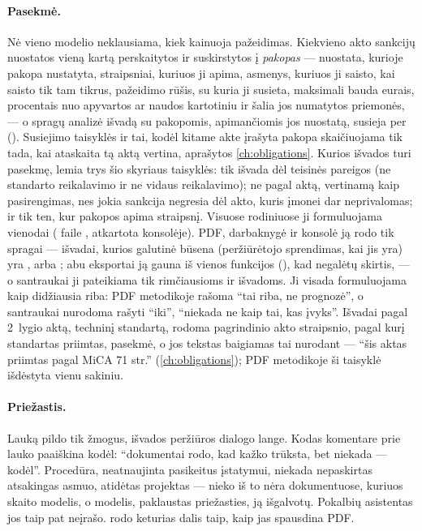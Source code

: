 \paragraph{Pasekmė.} Nė vieno modelio neklausiama, kiek kainuoja pažeidimas. Kiekvieno akto
sankcijų nuostatos vieną kartą perskaitytos ir suskirstytos į \emph{pakopas} --- nuostata, kurioje pakopa
nustatyta, straipsniai, kuriuos ji apima, asmenys, kuriuos ji saisto, kai saisto tik tam tikrus, pažeidimo rūšis, su kuria ji susieta, maksimali bauda
eurais, procentais nuo apyvartos ar naudos kartotiniu ir šalia jos numatytos priemonės, --- o
spragų analizė išvadą su pakopomis, apimančiomis jos nuostatą, susieja per
 (). Susiejimo taisyklės ir tai, kodėl kitame
akte įrašyta pakopa skaičiuojama tik tada, kai ataskaita tą aktą vertina, aprašytos
\cref{ch:obligations}. Kurios išvados turi pasekmę, lemia trys šio skyriaus taisyklės: tik
išvada dėl teisinės pareigos (ne standarto reikalavimo ir ne vidaus reikalavimo); ne pagal aktą,
vertinamą kaip pasirengimas, nes jokia sankcija negresia dėl akto, kuris įmonei dar neprivalomas;
ir tik ten, kur pakopos apima straipsnį. Visuose rodiniuose ji formuluojama vienodai
( faile , atkartota konsolėje). PDF, darbaknygė
ir konsolė
ją rodo tik spragai --- išvadai, kurios galutinė būsena (peržiūrėtojo sprendimas, kai jis yra)
yra , 
arba ; abu eksportai ją gauna iš vienos funkcijos (), kad
negalėtų skirtis, --- o santraukai ji pateikiama tik rimčiausioms  ir
 išvadoms. Ji visada formuluojama kaip didžiausia riba: PDF
metodikoje rašoma \enquote{tai riba, ne prognozė}, o santraukai nurodoma rašyti \enquote{iki},
\enquote{niekada ne kaip tai, kas įvyks}. Išvadai pagal 2~lygio aktą, techninį standartą,
rodoma pagrindinio akto straipsnio, pagal kurį standartas priimtas, pasekmė, o jos tekstas
baigiamas tai nurodant --- \enquote{šis aktas priimtas pagal MiCA 71 str.}
(\cref{ch:obligations}); PDF metodikoje ši taisyklė išdėstyta vienu sakiniu.

\paragraph{Priežastis.} Lauką  pildo tik žmogus, išvados peržiūros dialogo lange.
Kodas komentare prie lauko paaiškina kodėl: \enquote{dokumentai rodo, kad kažko trūksta, bet
niekada --- kodėl}. Procedūra, neatnaujinta pasikeitus įstatymui, niekada nepaskirtas atsakingas
asmuo, atidėtas projektas --- nieko iš to nėra dokumentuose, kuriuos skaito modelis, o modelis,
paklaustas priežasties, ją išgalvotų. Pokalbių asistentas jos taip pat neįrašo.
 rodo keturias dalis taip, kaip jas spausdina PDF.

